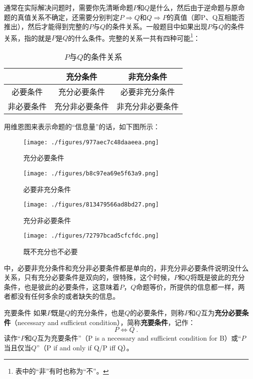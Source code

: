 通常在实际解决问题时，需要你先清晰命题$P$和$Q$是什么，然后由于逆命题与原命题的真值关系不确定，还需要分别判定$P\Rightarrow Q$和$Q\Rightarrow P$的真值（即P、Q互相能否推出），然后才能得到完整的$P$与$Q$的条件关系。一般题目中如果出现$P$与$Q$的条件关系，指的就是$P$是$Q$的什么条件。完整的关系一共有四种可能\footnote{表中的“非”有时也称为“不”。}：

\begin{table}[ht]
\centering
\caption{$P$与$Q$的条件关系}\label{tab_HsCoPr5}
\begin{tabular}{|c|c|c|}
\hline
& 充分条件 & 非充分条件 \\
\hline
必要条件& 充分必要条件 & 必要非充分条件 \\
\hline
非必要条件 & 充分非必要条件 & 非充分非必要条件 \\
\hline
\end{tabular}
\end{table}

用维恩图来表示命题的“信息量”的话，如下图所示：

\begin{figure}[ht]
\centering
\texttt{[image: ./figures/977aec7c48daaeea.png]}
\caption{充分必要条件} \label{fig_HsCoPr_1}
\end{figure}
\begin{figure}[ht]
\centering
\texttt{[image: ./figures/b8c97ea69e5f63a9.png]}
\caption{必要非充分条件} \label{fig_HsCoPr_2}
\end{figure}
\begin{figure}[ht]
\centering
\texttt{[image: ./figures/813479566ad8bd27.png]}
\caption{充分非必要条件} \label{fig_HsCoPr_3}
\end{figure}
\begin{figure}[ht]
\centering
\texttt{[image: ./figures/72797bcad5cfcfdc.png]}
\caption{既不充分也不必要} \label{fig_HsCoPr_4}
\end{figure}
中，必要非充分条件和充分非必要条件都是单向的，非充分非必要条件说明没什么关系，只有充分必要条件是双向的，很特殊，这个时候，$P$和$Q$将既是彼此的充分条件，也是彼此的必要条件，这意味着$P$，$Q$命题等价，所提供的信息都一样，两者都没有任何多余的或者缺失的信息。

\begin{definition}{充要条件}
如果$P$既是$Q$的充分条件，也是$Q$的必要条件，则称$P$和$Q$互为\textbf{充分必要条件}（necessary and sufficient condition），简称\textbf{充要条件}，记作：
\begin{equation}
P\Leftrightarrow Q~.
\end{equation}
读作“$P$和$Q$互为充要条件”（P is a necessary and sufficient condition for B）或“$P$当且仅当$Q$”（P if and only if Q/P iff Q）。
\end{definition}

